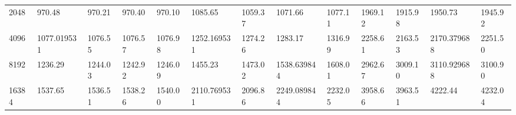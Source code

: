 \begin{table}[h!]
{\begin{tabular}{@{}lllllllllllll@{}}
    2048 & 970.48 & 970.21 & 970.40 & 970.10 & 1085.65 & 1059.37 & 1071.66 & 1077.11 & 1969.12 & 1915.98 & 1950.73 & 1945.92 \\
    4096 & 1077.019531 & 1076.55 & 1076.57 & 1076.98 & 1252.169531 & 1274.26 & 1283.17 & 1316.99 & 2258.61 & 2163.53 & 2170.379688 & 2251.50 \\
    8192 & 1236.29 & 1244.03 & 1242.92 & 1246.09 & 1455.23 & 1473.02 & 1538.639844 & 1608.01 & 2962.67 & 3009.10 & 3110.929688 & 3100.90 \\
    16384 & 1537.65 & 1536.51 & 1538.26 & 1540.00 & 2110.769531 & 2096.86 & 2249.089844 & 2232.05 & 3958.66 & 3963.51 & 4222.44 & 4232.04 \\
    \bottomrule
    \end{tabular}
    }
\end{table}